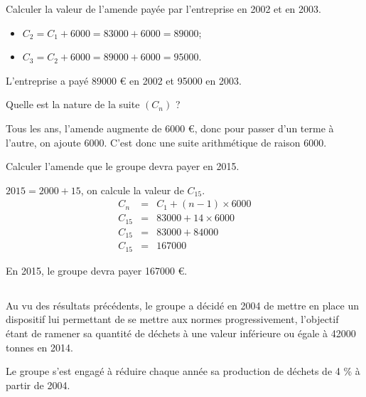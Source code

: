 \begin{questions}
	\question[1] Calculer la valeur de l'amende payée par l'entreprise en 2002 et en 2003.
		\begin{solution}
			\begin{itemize}
				\item $C_2 = C_1 + \num{6000} = \num{83000} + \num{6000} = \num{89000}$;
				\item $C_3 = C_2 + \num{6000} = \num{89000} + \num{6000} = \num{95000}$.
			\end{itemize}
		
		L'entreprise a payé \num{89000} € en 2002 et \num{95000} en 2003.
		\end{solution}
	\question[1] Quelle est la nature de la suite $(C_n)$ ?
		\begin{solution}
			Tous les ans, l'amende augmente de \num{6000} €, donc pour passer d'un terme à l'autre, on ajoute \num{6000}. C'est donc une suite arithmétique de raison \num{6000}.
		\end{solution}
	\question[1] Calculer l'amende que le groupe devra payer en 2015.
		\begin{solution}
			$2015 = 2000 + 15$, on calcule la valeur de $C_{15}$.
			\begin{eqnarray*}
				C_{n} & = & C_1 + (n - 1) \times \num{6000} \\
				C_{15} & = & \num{83000} + 14 \times \num{6000} \\
				C_{15} & = & \num{83000} + \num{84000} \\
				C_{15} & = & \num{167000}
			\end{eqnarray*}
		
		En 2015, le groupe devra payer \num{167000} €.
		\end{solution}
\end{questions}

\subsection{}

Au vu des résultats précédents, le groupe a décidé en 2004 de mettre en place un dispositif lui permettant de se mettre aux normes progressivement, l'objectif étant de ramener sa quantité de déchets à une valeur inférieure ou égale à \num{42000} tonnes en 2014.

Le groupe s'est engagé à réduire chaque année sa production de déchets de 4 \% à partir de 2004.\\

